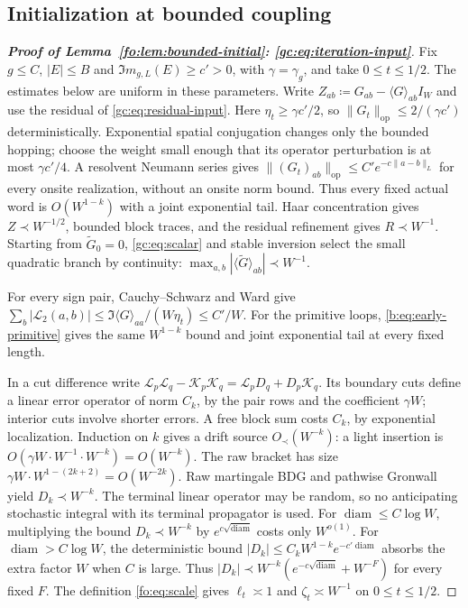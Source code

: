 \documentclass[11pt]{article}
\numberwithin{equation}{section}
\theoremstyle{remark}
\newcommand{\wt}{\widetilde}
\newcommand{\diam}{\operatorname{diam}}
\newcommand{\cL}{\mathcal L}
\newcommand{\cK}{\mathcal K}
\newcommand{\op}{\mathrm{op}}
\begin{document}
\subsection{Initialization at bounded coupling}
\label{sec:bounded-proof}\label{sec:bl-seed}

\begin{proof}[\textbf{Proof of Lemma~\ref{fo:lem:bounded-initial}: \eqref{gc:eq:iteration-input}}]
Fix $g\le C$, $|E|\le B$ and
$\Im m_{g,L}(E)\ge c'>0$, with $\gamma=\gamma_g$, and take $0\le t\le1/2$.
The estimates below are uniform in these parameters. Write
$Z_{ab}\coloneqq G_{ab}-\langle G\rangle_{ab}I_W$ and use the residual of
\eqref{gc:eq:residual-input}. Here $\eta_t\ge\gamma c'/2$, so $\|G_t\|_\op\le2/(\gamma c')$
deterministically. Exponential spatial conjugation changes only
the bounded hopping; choose the weight small enough that its
operator perturbation is at most $\gamma c'/4$. A resolvent Neumann
series gives $\|(G_t)_{ab}\|_\op\le C'e^{-c\|a-b\|_L}$
for every onsite realization, without an onsite norm bound.
Thus every fixed actual word is $O(W^{1-k})$ with a joint
exponential tail. Haar concentration gives $Z\prec W^{-1/2}$,
bounded block traces, and the residual refinement gives $R\prec W^{-1}$.
Starting from $\wt G_0=0$, \eqref{gc:eq:scalar} and stable inversion
select the small quadratic branch by continuity:
$\max_{a,b}|\langle\wt G\rangle_{ab}|\prec W^{-1}$.

For every sign pair, Cauchy--Schwarz and Ward give
$\sum_b|\cL_2(a,b)|\le\Im\langle G\rangle_{aa}/(W\eta_t)\le C'/W$.
For the primitive loops, \eqref{b:eq:early-primitive} gives the same
$W^{1-k}$ bound and joint exponential tail at every fixed length.

In a cut difference write
$\cL_p\cL_q-\cK_p\cK_q=\cL_pD_q+D_p\cK_q$.
Its boundary cuts define a linear error operator of norm $C_k$,
by the pair rows and the coefficient $\gamma W$; interior cuts involve
shorter errors. A free block sum costs $C_k$, by exponential
localization. Induction on $k$ gives a drift source $O_\prec(W^{-k})$:
a light insertion is $O(\gamma W\cdot W^{-1}\cdot W^{-k})=O(W^{-k})$.
The raw bracket has size
$\gamma W\cdot W^{1-(2k+2)}=O(W^{-2k})$.
Raw martingale BDG and pathwise Gronwall yield $D_k\prec W^{-k}$.
The terminal linear operator may be random, so no anticipating
stochastic integral with its terminal propagator is used.
For $\diam\le C\log W$, multiplying the bound $D_k\prec W^{-k}$
by $e^{c\sqrt{\diam}}$ costs only $W^{o(1)}$. For $\diam>C\log W$,
the deterministic bound $|D_k|\le C_kW^{1-k}e^{-c'\diam}$ absorbs
the extra factor $W$ when $C$ is large. Thus
$|D_k|\prec W^{-k}(e^{-c\sqrt{\diam}}+W^{-F})$ for every fixed $F$.
The definition \eqref{fo:eq:scale} gives
$\ell_t\asymp1$ and $\zeta_t\asymp W^{-1}$ on $0\le t\le1/2$.


\end{proof}
\end{document}
